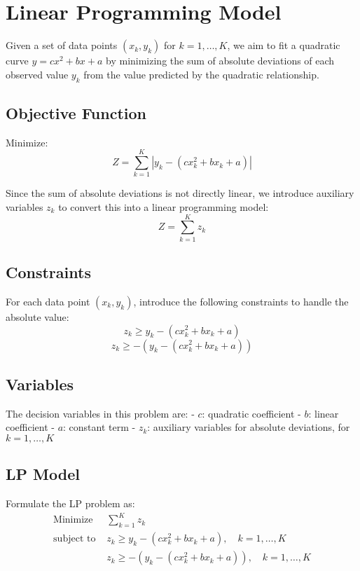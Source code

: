 \documentclass{article}
\begin{document}
\section*{Linear Programming Model}

Given a set of data points \((x_k, y_k)\) for \(k = 1, \ldots, K\), we aim to fit a quadratic curve \( y = cx^2 + bx + a \) by minimizing the sum of absolute deviations of each observed value \( y_k \) from the value predicted by the quadratic relationship.

\subsection*{Objective Function}
Minimize:
\[
Z = \sum_{k=1}^{K} |y_k - (c x_k^2 + b x_k + a)|
\]

Since the sum of absolute deviations is not directly linear, we introduce auxiliary variables \( z_k \) to convert this into a linear programming model:
\[
Z = \sum_{k=1}^{K} z_k
\]

\subsection*{Constraints}
For each data point \((x_k, y_k)\), introduce the following constraints to handle the absolute value:
\[
z_k \geq y_k - (c x_k^2 + b x_k + a)
\]
\[
z_k \geq -(y_k - (c x_k^2 + b x_k + a))
\]

\subsection*{Variables}
The decision variables in this problem are:
- \( c \): quadratic coefficient
- \( b \): linear coefficient
- \( a \): constant term
- \( z_k \): auxiliary variables for absolute deviations, for \( k = 1, \ldots, K \)

\subsection*{LP Model}
Formulate the LP problem as:
\[
\begin{align*}
\text{Minimize } & \sum_{k=1}^{K} z_k \\
\text{subject to } & z_k \geq y_k - (c x_k^2 + b x_k + a), \quad k = 1, \ldots, K \\
& z_k \geq -(y_k - (c x_k^2 + b x_k + a)), \quad k = 1, \ldots, K \\
\end{align*}
\]
\end{document}
